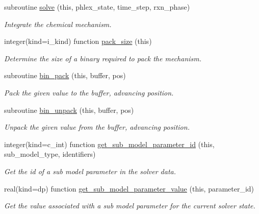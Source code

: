 \begin{DoxyCompactItemize}
subroutine \mbox{\hyperlink{namespacepmc__phlex__core_ad11997713c2b007cafdbe7aa2b4a8c6a}{solve}} (this, phlex\+\_\+state, time\+\_\+step, rxn\+\_\+phase)
\begin{DoxyCompactList}\small\item\em Integrate the chemical mechanism. \end{DoxyCompactList}\item 
integer(kind=i\+\_\+kind) function \mbox{\hyperlink{namespacepmc__phlex__core_acc35bccfc7c3e9afcac4c02ef70603c4}{pack\+\_\+size}} (this)
\begin{DoxyCompactList}\small\item\em Determine the size of a binary required to pack the mechanism. \end{DoxyCompactList}\item 
subroutine \mbox{\hyperlink{namespacepmc__phlex__core_a29957c901f68f6bb3da3eaa74a5aa482}{bin\+\_\+pack}} (this, buffer, pos)
\begin{DoxyCompactList}\small\item\em Pack the given value to the buffer, advancing position. \end{DoxyCompactList}\item 
subroutine \mbox{\hyperlink{namespacepmc__phlex__core_ac90388c65594512e1a8cbbbd5846ac65}{bin\+\_\+unpack}} (this, buffer, pos)
\begin{DoxyCompactList}\small\item\em Unpack the given value from the buffer, advancing position. \end{DoxyCompactList}\item 
integer(kind=c\+\_\+int) function \mbox{\hyperlink{namespacepmc__phlex__core_a3af28e9bd752be969deb76bed87ca603}{get\+\_\+sub\+\_\+model\+\_\+parameter\+\_\+id}} (this, sub\+\_\+model\+\_\+type, identifiers)
\begin{DoxyCompactList}\small\item\em Get the id of a sub model parameter in the solver data. \end{DoxyCompactList}\item 
real(kind=dp) function \mbox{\hyperlink{namespacepmc__phlex__core_ae94feceace9210cc12293628842f9a7e}{get\+\_\+sub\+\_\+model\+\_\+parameter\+\_\+value}} (this, parameter\+\_\+id)
\begin{DoxyCompactList}\small\item\em Get the value associated with a sub model parameter for the current solver state. \end{DoxyCompactList}\item 

\end{DoxyCompactItemize}
